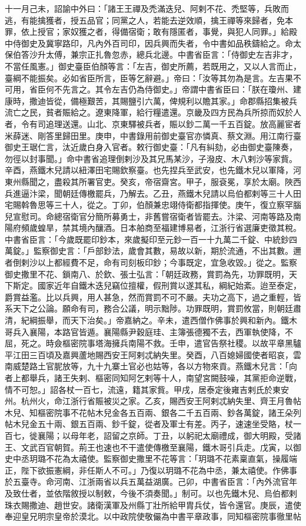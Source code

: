 \begin{pinyinscope}
 十一月己未，詔諭中外曰：「諸王王禪及禿滿迭兒、阿剌不花、禿堅等，兵敗而逃，有能擒獲者，授五品官；同黨之人，若能去逆效順，擒王禪等來歸者，免本罪，依上授官；家奴獲之者，得備宿衛；敢有隱匿者，事覺，與犯人同罪。」給殿中侍御史及冀寧路印，凡內外百司印，因兵興而失者，令中書如品秩鑄給之。命太保伯答沙升太傅，兼宗正扎魯忽赤，總兵北邊。中書省臣言：「侍御史左吉非才，不當任風憲。」御史臺臣伯顏等言：「左吉，御史所薦，若既用之，又以人言而止，臺綱不能振矣。必如省臣所言，臣等乞辭避。」帝曰：「汝等其勿為是言。左吉果不可用，省臣何不先言之。其令左吉仍為侍御史。」帝謂中書省臣曰：「朕在瓊州、建康時，撒迪皆從，備極艱苦，其賜鹽引六萬，俾規利以贍其家。」命郡縣招集被兵流亡之民，貧者賑給之。遼東降軍，給行糧遣還。京畿及四方民為兵所掠而奴於人者，令有司追理送還。山北、京東驛被兵者，賑以鈔二萬一千五百錠。放高麗宦者米薛迷、剛答里歸田里。庚申，中書錄用前御史臺官亦憐真、蔡文淵。用江南行臺御史王琚仁言，汰近歲白身入官者。敕行御史臺：「凡有糾劾，必由御史臺陳奏，勿徑以封事聞。」命中書省追理倒剌沙及其兄馬某沙，子潑皮、木八剌沙等家貲。辛酉，燕鐵木兒請以紐澤田宅賜欽察臺。也先捏兵至武安，也先鐵木兒以軍降，河東州縣聞之，盡殺其所署官吏。癸亥，帝宿齋宮。甲子，服袞冕，享於太廟。陜西兵進逼汴梁，聞朝廷傳檄罷兵，乃解去。乙丑，燕鐵木兒請以烏伯都剌等三十人田宅賜斡魯思等三十人，從之。丁卯，伯顏兼忠翊侍衛都指揮使。庚午，復立察罕腦兒宣慰司。命總宿衛官分簡所募勇士，非舊嘗宿衛者皆罷去。汴梁、河南等路及南陽府頻歲蝗旱，禁其境內釀酒。日本舶商至福建博易者，江浙行省選廉吏徵其稅。中書省臣言：「今歲既罷印鈔本，來歲擬印至元鈔一百一十九萬二千錠、中統鈔四萬錠。」監察御史言：「戶部鈔法，歲會其數，易故以新，期於流通，不出其數。邇者倒剌沙以上都經費不足，命有司刻板印鈔；今事既定，宜急收毀。」從之。監察御史撒里不花、鎖南八、於欽、張士弘言：「朝廷政務，賞罰為先，功罪既明，天下斯定。國家近年自鐵木迭兒竊位擅權，假刑賞以遂其私，綱紀始紊。迨至泰定，爵賞益濫。比以兵興，用人甚急，然而賞罰不可不嚴。夫功之高下，過之重輕，皆系天下之公論。願命有司，務合公議，明示黜陟。功罪既明，賞罰攸當，則朝廷肅清，紀綱振舉，而天下治矣。」帝嘉納之。辛未，遣西僧作佛事於興和新內。鐵木哥兵入襄陽，本路官皆遁。襄陽縣尹穀庭珪、主簿張德獨不去，西軍執使降，不屈，死之。時僉樞密院事塔海擁兵南陽不救。壬申，遣官告祭社稷。以故平章黑驢平江田三百頃及嘉興蘆地賜西安王阿剌忒納失里。癸酉，八百媳婦國使者昭哀，雲南威楚路土官胒放等，九十九寨土官必也姑等，各以方物來貢。燕鐵木兒言：「向者上都舉兵，諸王失剌、樞密同知阿乞剌等十人，南望宮闕鼓噪，其黨拒命逆戰，情不可恕。」詔各杖一百七，流遠，籍其家貲。甲戌，居泰定後雍吉剌氏於東安州。杭州火，命江浙行省賑被災之家。乙亥，賜西安王阿剌忒納失里、齊王月魯帖木兒、知樞密院事不花帖木兒金各五百兩、銀各二千五百兩、鈔各萬錠，諸王朵列帖木兒金五十兩、銀五百兩、鈔千錠，從者及軍士有差。丙子，速速坐受賂，杖一百七，徙襄陽；以母年老，詔留之京師。丁丑，以躬祀太廟禮成，御大明殿，受諸王、文武百官朝賀。荊王也速也不干遣使傳檄至襄陽，鐵木哥引兵走。戊寅，以御史中丞玥璐不花為太禧使。監察御史撒里不花等言：「玥璐不花素稟直氣，操履端正，陛下欲振憲綱，非任斯人不可。」乃復以玥璐不花為中丞，兼太禧使。作佛事於五臺寺。命河南、江浙兩省以兵五萬益湖廣。己卯，中書省臣言：「內外流官年及致仕者，並依階敘授以制敕，今後不須奏聞。」制可。以也先鐵木兒、烏伯都剌珠衣賜撒迪、趙世安。諸衛漢軍及州縣丁壯所給甲胄兵仗，皆令還官。庚辰，遣使奉迎皇兄明宗皇帝於漠北。以中政院使敬儼為中書平章政事，同知樞密院事徹里帖
\end{pinyinscope}
